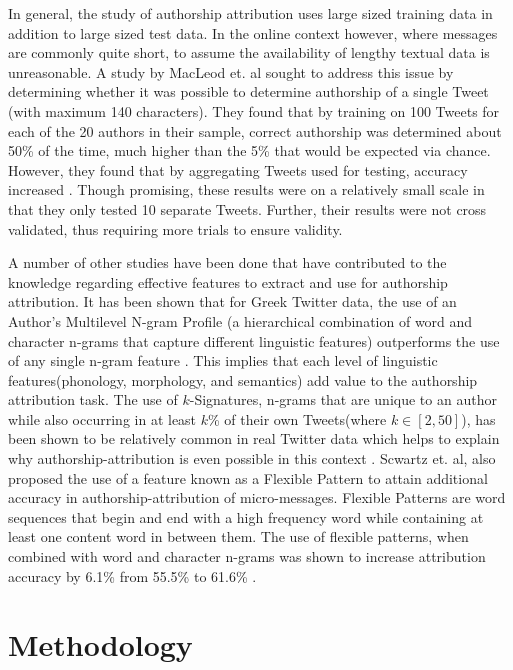 \documentclass[pageno]{jpaper}
\begin{document}
In general, the study of authorship attribution uses large sized training data in addition to large sized test data.  In the online context however, where messages are commonly quite short, to assume the availability of lengthy textual data is unreasonable.  A study by MacLeod et. al sought to address this issue by determining whether it was possible to determine authorship of a single Tweet (with maximum 140 characters).  They found that by training on 100 Tweets for each of the 20 authors in their sample, correct authorship was determined about 50\% of the time, much higher than the 5\% that would be expected via chance.  However, they found that by aggregating Tweets used for testing, accuracy increased \cite{whose-Tweet}.  Though promising, these results were on a relatively small scale in that they only tested 10 separate Tweets.  Further, their results were not cross validated, thus requiring more trials to ensure validity.  

A number of other studies have been done that have contributed to the knowledge regarding effective features to extract and use for authorship attribution.  It has been shown that for Greek Twitter data, the use of an Author's Multilevel N-gram Profile (a hierarchical combination of word and character n-grams that capture different linguistic features) outperforms the use of any single n-gram feature \cite{Greek-paper}.  This implies that each level of linguistic features(phonology, morphology, and semantics) add value to the authorship attribution task.  The use of $k$-Signatures, n-grams that are unique to an author while also occurring in at least $k$\% of their own Tweets(where $k \in[2, 50]$), has been shown to be relatively common in real Twitter data which helps to explain why authorship-attribution is even possible in this context \cite{schwartz-EtAl:2013:EMNLP}.  Scwartz et. al, also proposed the use of a feature known as a Flexible Pattern to attain additional accuracy in authorship-attribution of micro-messages.  Flexible Patterns are word sequences that begin and end with a high frequency word while containing at least one content word in between them.  The use of flexible patterns, when combined with word and character n-grams was shown to increase attribution accuracy by 6.1\% from 55.5\% to 61.6\% \cite{schwartz-EtAl:2013:EMNLP}.

\section{Methodology}
\label{sec:methodology}
\end{document}

